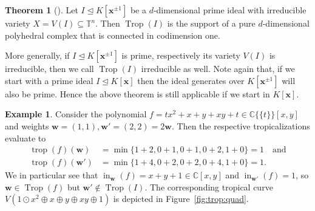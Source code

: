 \documentclass[
  paper=a4,
  titlepage,
  bibliography=totoc,
  listof=totoc,
  pagesize=pdftex
]{scrartcl}
\numberwithin{figure}{section}
\numberwithin{equation}{section}
\numberwithin{table}{section}
\newcommand*\setC{\mathds{C}}
\newcommand*\setT{\mathds{T}}
\newcommand*\puiseux[2]{#1\{\!\{#2\}\!\}}
\newcommand*\CCt{\puiseux{\setC}{t}}
\let\vec\mathbf
\let\idealof\trianglelefteq
\DeclareMathOperator{\Trop}{Trop}
\DeclareMathOperator{\trop}{trop}
\DeclareMathOperator{\initial}{in}
\theoremstyle{definition}
\newtheorem{theorem}[definition]{Theorem}
\newtheorem{example}[definition]{Example}
\numberwithin{definition}{section}
\begin{document}
\begin{theorem}[{\cite[Theorem~3.5.1]{sturmMacTrop}}]
  \label{thm:tropComplexConn}
  Let $I \idealof K[\vec x^{\pm1}]$ be a $d$-dimensional prime ideal with irreducible
  variety $X = V(I) \subseteq \setT^n$. Then $\Trop(I)$ is the support of a pure
  $d$-dimensional polyhedral complex that is connected in codimension one.
\end{theorem}

More generally, if $I \idealof K[\vec x^{\pm1}]$ is prime, respectively its variety $V(I)$
is irreducible, then we call $\Trop(I)$ irreducible as well. Note again that, if we start
with a prime ideal $I \idealof K[\vec x]$ then the ideal generates over $K[\vec x^{\pm1}]$
will also be prime. Hence the above theorem is still applicable if we start in $K[\vec
x]$.

\begin{example}
  \label{ex:notFan}
  Consider the polynomial $f = tx^2 + x + y + xy + t \in \CCt[x,y]$ and weights $\vec w =
  (1,1), \vec w' = (2,2) = 2 \vec w$. Then the respective tropicalizations evaluate to
  \begin{align*}
    \trop(f)(\vec w) &= \min \{ 1 + 2, 0 + 1, 0 + 1, 0 + 2, 1 + 0 \} = 1 \quad
    \text{and} \\
    \trop(f)(\vec w') &= \min \{ 1 + 4, 0 + 2, 0 + 2, 0 + 4, 1 + 0 \} = 1.
  \end{align*}
  We in particular see that $\initial_{\vec w}(f) = x+y+1 \in \setC[x,y]$ and
  $\initial_{\vec w'}(f) = 1$, so $\vec w \in \Trop(f)$ but $\vec w' \not\in \Trop(I)$.
  The corresponding tropical curve $V(1\odot x^2 \oplus x \oplus y \oplus xy \oplus 1)$ is
  depicted in Figure~\ref{fig:trop:quad}.
\end{example}
\end{document}

